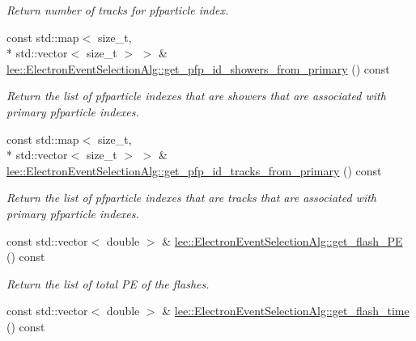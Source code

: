 \begin{DoxyCompactItemize}
\begin{DoxyCompactList}\small\item\em Return number of tracks for pfparticle index. \end{DoxyCompactList}\item 
\hypertarget{group__lee_ga7ea645ce175506b368ceb116bbb77889}{const std\-::map$<$ size\-\_\-t, \\*
std\-::vector$<$ size\-\_\-t $>$ $>$ \& \hyperlink{group__lee_ga7ea645ce175506b368ceb116bbb77889}{lee\-::\-Electron\-Event\-Selection\-Alg\-::get\-\_\-pfp\-\_\-id\-\_\-showers\-\_\-from\-\_\-primary} () const }\label{group__lee_ga7ea645ce175506b368ceb116bbb77889}

\begin{DoxyCompactList}\small\item\em Return the list of pfparticle indexes that are showers that are associated with primary pfparticle indexes. \end{DoxyCompactList}\item 
\hypertarget{group__lee_ga00266c70e046a9ee27e979be75925a09}{const std\-::map$<$ size\-\_\-t, \\*
std\-::vector$<$ size\-\_\-t $>$ $>$ \& \hyperlink{group__lee_ga00266c70e046a9ee27e979be75925a09}{lee\-::\-Electron\-Event\-Selection\-Alg\-::get\-\_\-pfp\-\_\-id\-\_\-tracks\-\_\-from\-\_\-primary} () const }\label{group__lee_ga00266c70e046a9ee27e979be75925a09}

\begin{DoxyCompactList}\small\item\em Return the list of pfparticle indexes that are tracks that are associated with primary pfparticle indexes. \end{DoxyCompactList}\item 
\hypertarget{group__lee_ga306e62904f73e727c6f938d2a197f68e}{const std\-::vector$<$ double $>$ \& \hyperlink{group__lee_ga306e62904f73e727c6f938d2a197f68e}{lee\-::\-Electron\-Event\-Selection\-Alg\-::get\-\_\-flash\-\_\-\-P\-E} () const }\label{group__lee_ga306e62904f73e727c6f938d2a197f68e}

\begin{DoxyCompactList}\small\item\em Return the list of total P\-E of the flashes. \end{DoxyCompactList}\item 
\hypertarget{group__lee_ga9990f4a980662e786fc8e38146ce4456}{const std\-::vector$<$ double $>$ \& \hyperlink{group__lee_ga9990f4a980662e786fc8e38146ce4456}{lee\-::\-Electron\-Event\-Selection\-Alg\-::get\-\_\-flash\-\_\-time} () const }\label{group__lee_ga9990f4a980662e786fc8e38146ce4456}


\end{DoxyCompactItemize}
